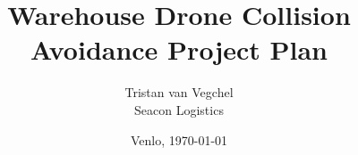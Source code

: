 


\title{Warehouse Drone Collision Avoidance Project Plan}
\author{Tristan van Vegchel \hfil \\
	Seacon Logistics}
\date{Venlo, \today}

\makenoidxglossaries


\renewcommand{\bibname}{References}



	\pagestyle{fancy}
	\newcommand{\headrulecolor}[1]{\patchcmd{\headrule}{\hrule}{\color{#1}\hrule}{}{}}
	\newcommand{\footrulecolor}[1]{\patchcmd{\footrule}{\hrule}{\color{#1}\hrule}{}{}}
	\pagestyle{fancy}
	\fancyhf{}%
	\fancyhead[C]{}
	\fancyhead[R]{\thepage}
	\setlength{\headsep}{33pt}
	\setlength{\headheight}{13.6pt}
	\renewcommand{\headrulewidth}{0.4pt}
	\maketitle
	\setcounter{page}{2}
	
	
	\tableofcontents
	\listoffigures
	\listoftables
	\glsaddall
	\printnoidxglossary[type=\acronymtype,title=List of Abbreviations]
	\printnoidxglossary[title=Definitions]
	
	\pagebreak
	
	
	
	
	
	
	
	
	
	
	\begin{appendices}
		
	\end{appendices}
